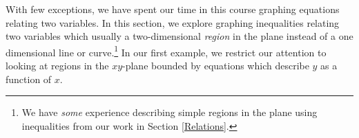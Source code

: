 \documentclass{ximera}
\begin{document}
	\author{Stitz-Zeager}




\setcounter{footnote}{0}

\label{NonLinearInequalities}

With few exceptions, we have spent our time in this course graphing equations relating two variables.  In this section, we explore graphing inequalities relating two variables which  usually a two-dimensional \textit{region} in the plane instead of a one dimensional line or curve.\footnote{We have \textit{some} experience describing simple regions in the plane using inequalities from our work in Section \ref{Relations}.}  In our first example, we restrict our attention to looking at regions in the $xy$-plane bounded by equations which describe $y$ as a function of $x$.
\end{document}
